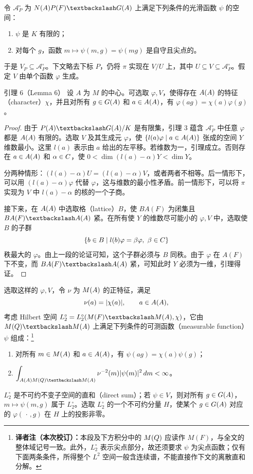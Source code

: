 令 $\mathcal A_P^\circ$ 为 $N(\A)P(F)\backslash G(\A)$ 上满足下列条件的光滑函数 $\psi$ 的空间：
\begin{enumerate}
\item[(a)] $\psi$ 是 $K$ 有限的；
\item[(b)] 对每个 $g$，函数 $m\mapsto\psi(m,g)=\psi(mg)$ 是自守且尖点的。
\end{enumerate}
于是 $V_P\subseteq\mathcal A_P^\circ$。下文略去下标 $P$，仍将 $\pi$ 实现在 $V/U$ 上，其中 $U\subseteq V\subseteq\mathcal A_P^\circ$。假定 $V$ 由单个函数 $\varphi$ 生成。

\begin{originaltheorem}{引理 6（Lemma 6）}
设 $A$ 为 $M$ 的中心。可选取 $\varphi,V$，使得存在 $A(A)$ 的特征（character）$\chi$，并且对所有 $g\in G(A)$ 和 $a\in A(A)$，有 $\varphi(ag)=\chi(a)\varphi(g)$。
\end{originaltheorem}
\begin{proof}
由于 $P(\A)\backslash G(\A)/K$ 是有限集，引理 3 蕴含 $\mathcal A_P^\circ$ 中任意 $\varphi$ 都是 $A(A)$ 有限的。选取 $V$ 及其生成元 $\varphi$，使 $\{l(a)\varphi\mid a\in A(A)\}$ 张成的空间 $Y$ 维数最小。这里 $l(a)$ 表示由 $a$ 给出的左平移。若维数为一，引理成立。否则存在 $a\in A(A)$ 和 $\alpha\in C$，使 $0<\dim(l(a)-\alpha)Y<\dim Y$。

分两种情形：$(l(a)-\alpha)U=(l(a)-\alpha)V$，或者两者不相等。后一情形下，可以用 $(l(a)-\alpha)\varphi$ 代替 $\varphi$，这与维数的最小性矛盾。前一情形下，可以将 $\pi$ 实现为 $V$ 中 $l(a)-\alpha$ 的核的一个子商。

接下来，在 $A(A)$ 中选取格（lattice）$B$，使 $BA(F)$ 为闭集且 $BA(F)\backslash A(\A)$ 紧。在所有使 $Y$ 的维数尽可能小的 $\varphi,V$ 中，选取使 $B$ 的子群
\[
\{b\in B\mid l(b)\varphi=\beta\varphi,\ \beta\in C\}
\]
秩最大的 $\varphi$。由上一段的论证可知，这个子群必须与 $B$ 同秩。由于 $\varphi$ 在 $A(F)$ 下不变，而 $BA(F)\backslash A(\A)$ 紧，可知此时 $Y$ 必须为一维，引理得证。
\end{proof}

选取这样的 $\varphi,V$，令 $\nu$ 为 $M(A)$ 的正特征，满足
\[
\nu(a)=|\chi(a)|,\qquad a\in A(A),
\]
考虑 Hilbert 空间 $L_2^\circ=L_2^\circ(M(F)\backslash M(\A),\chi)$，它由 $M(\Q)\backslash M(\A)$ 上满足下列条件的可测函数（measurable function）$\psi$ 组成：\footnote{\textbf{译者注（本次校订）：}本段及下方积分中的 $M(Q)$ 应读作 $M(F)$，与全文的整体域记号一致。此外，$L_2^\circ$ 表示尖点部分，故还须要求 $\psi$ 为尖点函数；仅有下面两条条件，所得整个 $L^2$ 空间一般含连续谱，不能直接作下文的离散直和分解。}
\begin{enumerate}
\item[(i)] 对所有 $m\in M(A)$ 和 $a\in A(A)$，有 $\psi(ag)=\chi(a)\psi(g)$；
\item[(ii)] $\displaystyle\int_{A(\A)M(\Q)\backslash M(\A)}\nu^{-2}(m)|\psi(m)|^2\,dm<\infty$。
\end{enumerate}
$L_2^\circ$ 是不可约不变子空间的直和（direct sum）；若 $\psi\in V$，则对所有 $g\in G(A)$，$m\mapsto\psi(m,g)$ 属于 $L_2^\circ$。选取 $L_2^\circ$ 的一个不可约分量 $H$，使某个 $g\in G(A)$ 对应的 $\varphi(\,\cdot\,,g)$ 在 $H$ 上的投影非零。

